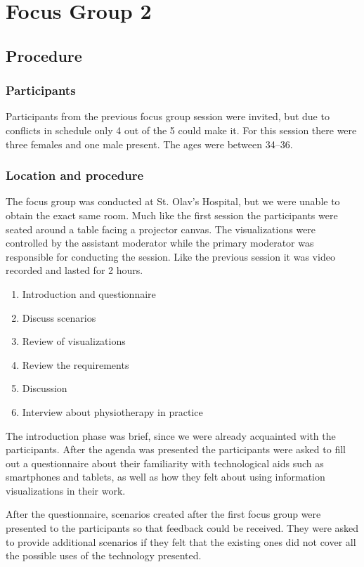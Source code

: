 \chapter{Focus Group 2}
\label{ch:focusGroup2}

\section{Procedure}

\subsection{Participants}
Participants from the previous focus group session were invited, but due to conflicts in schedule only 4 out of the 5 could make it. For this session there were three females and one male present. The ages were between 34--36.

\subsection{Location and procedure}
The focus group was conducted at St. Olav's Hospital, but we were unable to obtain the exact same room.  Much like the first session the participants were seated around a table facing a projector canvas. The visualizations were controlled by the assistant moderator while the primary moderator was responsible for conducting the session. Like the previous session it was video recorded and lasted for 2 hours.

\begin{enumerate}[itemsep=0cm, parsep=0cm]
  \item Introduction and questionnaire
  \item Discuss scenarios
  \item Review of visualizations
  \item Review the requirements
  \item Discussion
  \item Interview about physiotherapy in practice
\end{enumerate}

The introduction phase was brief, since we were already acquainted with the participants. After the agenda was presented the participants were asked to fill out a questionnaire about their familiarity with technological aids such as smartphones and tablets, as well as how they felt about using information visualizations in their work. 

After the questionnaire, scenarios created after the first focus group were presented to the participants so that feedback could be received. They were asked to provide additional scenarios if they felt that the existing ones did not cover all the possible uses of the technology presented.

